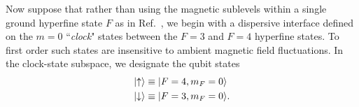 \documentclass[preprint,aps,pra,onecolumn]{revtex4-1} %
\begin{document}
Now suppose that rather than using the magnetic sublevels within a single ground hyperfine state $F$ as 
in Ref.~\cite{Deutsch2010a}, we begin with a dispersive interface defined on the $m=0$ ``\textit{clock}" states 
between the $F=3$ and $F=4$ hyperfine states.  To first order such states are insensitive to ambient 
magnetic field fluctuations.  In the clock-state subspace, we designate the qubit states
\begin{align} 
	\lvert{\uparrow}\rangle &\equiv \lvert{F = 4,m_F = 0}\rangle \\
 	\lvert{\downarrow}\rangle &\equiv \lvert{F = 3,m_F=0}\rangle.
\end{align}

\begin{figure}
\centering
\begin{minipage}{.49\linewidth}
\centering
{}
\end{minipage}
\begin{minipage}{.49\linewidth}
\centering
{}

\end{minipage}
\end{figure}
\end{document}
